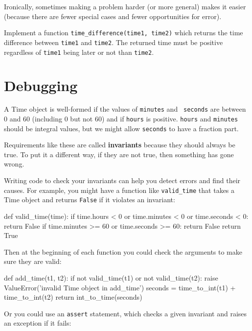 
Ironically, sometimes making a problem harder (or more general) makes it
easier (because there are fewer special cases and fewer opportunities
for error).

\begin{exercise}
Implement a function {\tt time\_difference(time1, time2)} which returns the time 
difference between {\tt time1} and {\tt time2}. The returned time must be positive
regardless of {\tt time1} being later or not than {\tt time2}.
\end{exercise}

\section{Debugging}

A Time object is well-formed if the values of {\tt minutes} and {\tt
seconds} are between 0 and 60 (including 0 but not 60) and if 
{\tt hours} is positive.  {\tt hours} and {\tt minutes} should be
integral values, but we might allow {\tt seconds} to have a
fraction part.


Requirements like these are called {\bf invariants} because
they should always be true.  To put it a different way, if they
are not true, then something has gone wrong.

Writing code to check your invariants can help you detect errors
and find their causes.  For example, you might have a function
like \verb"valid_time" that takes a Time object and returns
{\tt False} if it violates an invariant:

\beforeverb
\begin{pycode}
def valid_time(time):
    if time.hours < 0 or time.minutes < 0 or time.seconds < 0:
        return False
    if time.minutes >= 60 or time.seconds >= 60:
        return False
    return True
\end{pycode}
\afterverb
%
Then at the beginning of each function you could check the
arguments to make sure they are valid:


\beforeverb
\begin{pycode}
def add_time(t1, t2):
    if not valid_time(t1) or not valid_time(t2):
        raise ValueError('invalid Time object in add_time')
    seconds = time_to_int(t1) + time_to_int(t2)
    return int_to_time(seconds)
\end{pycode}
\afterverb
%
Or you could use an {\tt assert} statement, which checks a given invariant
and raises an exception if it fails:

